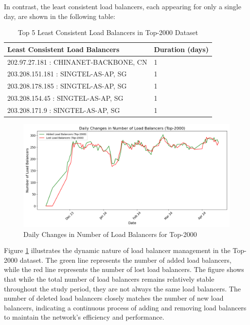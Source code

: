 \documentclass[12pt]{cwru_thesis}
\begin{document}
In contrast, the least consistent load balancers, each appearing for only a single day, are shown in the following table:

\begin{table}[h!]
    \centering
    \begin{tabular}{|l|l|}
        \hline
        \textbf{Least Consistent Load Balancers} & \textbf{Duration (days)} \\ \hline
        202.97.27.181 : CHINANET-BACKBONE, CN & 1 \\ \hline
        203.208.151.181 : SINGTEL-AS-AP, SG & 1 \\ \hline
        203.208.178.185 : SINGTEL-AS-AP, SG & 1 \\ \hline
        203.208.154.45 : SINGTEL-AS-AP, SG & 1 \\ \hline
        203.208.171.9 : SINGTEL-AS-AP, SG & 1 \\ \hline
    \end{tabular}
    \caption{Top 5 Least Consistent Load Balancers in Top-2000 Dataset}
\end{table}

\begin{figure}[h!]
    \centering
    \includegraphics[width=\linewidth]{figures/load_balancer_changes_Top-2000.png}
    \caption{Daily Changes in Number of Load Balancers for Top-2000}
    \label{fig:top2000_changes}
\end{figure}

Figure \ref{fig:top2000_changes} illustrates the dynamic nature of load balancer management in the Top-2000 dataset. The green line represents the number of added load balancers, while the red line represents the number of lost load balancers. The figure shows that while the total number of load balancers remains relatively stable throughout the study period, they are not always the same load balancers. The number of deleted load balancers closely matches the number of new load balancers, indicating a continuous process of adding and removing load balancers to maintain the network's efficiency and performance.
\end{document}
